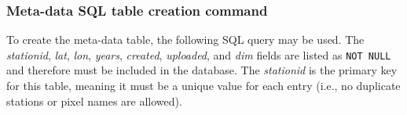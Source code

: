 \subsubsection{Meta-data SQL table creation command}
\label{sec:dbmtsql}
To create the meta-data table, the following SQL query may be used. 
The \emph{stationid}, \emph{lat}, \emph{lon}, \emph{years}, \emph{created}, \emph{uploaded}, and \emph{dim} fields are listed as \texttt{NOT NULL} and therefore must be included in the database.  
The \emph{stationid} is the primary key for this table, meaning it must be a unique value for each entry (i.e., no duplicate stations or pixel names are allowed).\\


